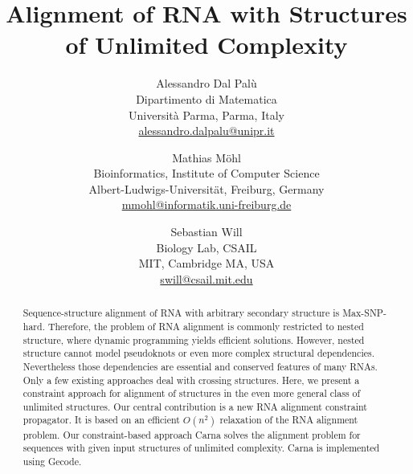 \documentclass{easychair}
\title{Alignment of RNA with Structures of Unlimited Complexity}
\begin{document}
\author{Alessandro Dal Pal{\`u}\\
Dipartimento di  Matematica\\
Universit\`a Parma, Parma, Italy\\
\url{alessandro.dalpalu@unipr.it}\\
\and
Mathias M{\"o}hl\\
Bioinformatics, Institute of Computer Science\\
Albert-Ludwigs-Universit\"{a}t, Freiburg, Germany\\
\url{mmohl@informatik.uni-freiburg.de}\\
\and
Sebastian Will\\
Biology Lab, CSAIL\\
MIT, Cambridge MA, USA\\
\url{swill@csail.mit.edu}\\
}


\maketitle

\begin{abstract}
  Sequence-structure alignment of RNA with arbitrary secondary
  structure is Max-SNP-hard. Therefore, the problem of RNA alignment
  is commonly restricted to nested structure, where dynamic
  programming yields efficient solutions. However, nested structure
  cannot model pseudoknots or even more complex structural
  dependencies.  Nevertheless those dependencies are essential and
  conserved features of many RNAs. Only a few existing approaches deal
  with crossing structures. Here, we present a constraint approach for
  alignment of structures in the even more general class of unlimited
  structures.  Our central contribution is a new RNA alignment
  constraint propagator. It is based on an efficient $O(n^2)$
  relaxation of the RNA alignment problem. Our constraint-based
  approach Carna solves the alignment problem for sequences with given
  input structures of unlimited complexity. Carna is implemented using
  Gecode.
\end{abstract}
\end{document}
